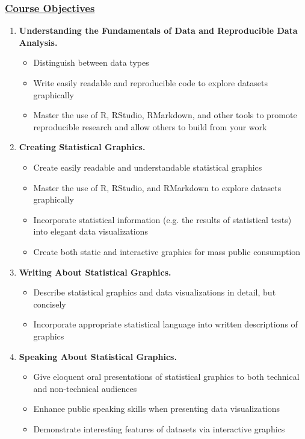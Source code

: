 \documentclass[11pt]{article}
\begin{document}
\vspace*{1mm}

\subsubsection*{\underline{Course Objectives}}
\begin{enumerate}
\item {\bf Understanding the Fundamentals of Data and Reproducible Data Analysis.}
\begin{itemize}
	\item Distinguish between data types
	\item Write easily readable and reproducible code to explore datasets graphically
	\item Master the use of R, RStudio, RMarkdown, and other tools to promote reproducible research and allow others to build from your work
\end{itemize}

\item {\bf Creating Statistical Graphics.}
\begin{itemize}
	\item Create easily readable and understandable statistical graphics
	\item Master the use of R, RStudio, and RMarkdown to explore datasets graphically
	\item Incorporate statistical information (e.g. the results of statistical tests) into elegant data visualizations
	\item Create both static and interactive graphics for mass public consumption
\end{itemize}

\item {\bf Writing About Statistical Graphics.}
\begin{itemize}
	\item Describe statistical graphics and data visualizations in detail, but concisely
	\item Incorporate appropriate statistical language into written descriptions of graphics
\end{itemize}

\item {\bf Speaking About Statistical Graphics.}
\begin{itemize}
	\item Give eloquent oral presentations of statistical graphics to both technical and non-technical audiences
	\item Enhance public speaking skills when presenting data visualizations
	\item Demonstrate interesting features of datasets via interactive graphics
\end{itemize}


\end{enumerate}
\end{document}
